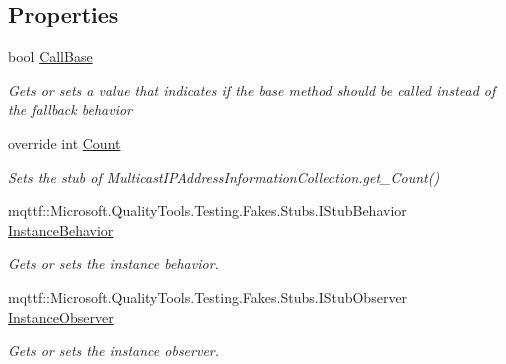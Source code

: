 \subsection*{Properties}
\begin{DoxyCompactItemize}
\item 
bool \hyperlink{class_system_1_1_net_1_1_network_information_1_1_fakes_1_1_stub_multicast_i_p_address_information_collection_aa63e5841b72548c7125c75aeb75bf42f}{Call\-Base}
\begin{DoxyCompactList}\small\item\em Gets or sets a value that indicates if the base method should be called instead of the fallback behavior\end{DoxyCompactList}\item 
override int \hyperlink{class_system_1_1_net_1_1_network_information_1_1_fakes_1_1_stub_multicast_i_p_address_information_collection_a4317fee9461661d380ea78c03bc1d53a}{Count}
\begin{DoxyCompactList}\small\item\em Sets the stub of Multicast\-I\-P\-Address\-Information\-Collection.\-get\-\_\-\-Count()\end{DoxyCompactList}\item 
mqttf\-::\-Microsoft.\-Quality\-Tools.\-Testing.\-Fakes.\-Stubs.\-I\-Stub\-Behavior \hyperlink{class_system_1_1_net_1_1_network_information_1_1_fakes_1_1_stub_multicast_i_p_address_information_collection_aa195e16940f4ae6aea1e31570e9dc457}{Instance\-Behavior}
\begin{DoxyCompactList}\small\item\em Gets or sets the instance behavior.\end{DoxyCompactList}\item 
mqttf\-::\-Microsoft.\-Quality\-Tools.\-Testing.\-Fakes.\-Stubs.\-I\-Stub\-Observer \hyperlink{class_system_1_1_net_1_1_network_information_1_1_fakes_1_1_stub_multicast_i_p_address_information_collection_a0b9fd2c33a879abaf9337a20dab1f612}{Instance\-Observer}
\begin{DoxyCompactList}\small\item\em Gets or sets the instance observer.\end{DoxyCompactList}\item 

\end{DoxyCompactItemize}
